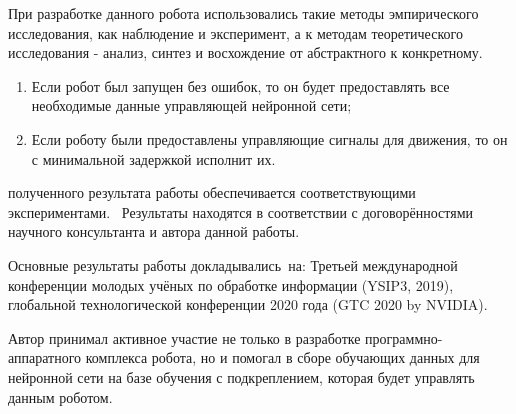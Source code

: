 {\methods} При разработке данного робота использовались такие методы эмпирического исследования, как наблюдение и эксперимент, а к методам теоретического исследования - анализ, синтез и восхождение от абстрактного к конкретному.

{}
\begin{enumerate}[beginpenalty=10000] %
  \item Если робот был запущен без ошибок, то он будет предоставлять все необходимые данные управляющей нейронной сети;
  \item Если роботу были предоставлены управляющие сигналы для движения, то он с минимальной задержкой исполнит их.
\end{enumerate}

{\reliability} полученного результата работы обеспечивается соответствующими экспериментами. \ Результаты находятся в соответствии с договорённостями научного консультанта и автора данной работы.


{\probation}
Основные результаты работы докладывались~на:
Третьей международной конференции молодых учёных по обработке информации (YSIP3, 2019), глобальной технологической конференции 2020 года (GTC 2020 by NVIDIA).

{\contribution} Автор принимал активное участие не только в разработке программно-аппаратного комплекса робота, но и помогал в сборе обучающих данных для нейронной сети на базе обучения с подкреплением, которая будет управлять данным роботом.

